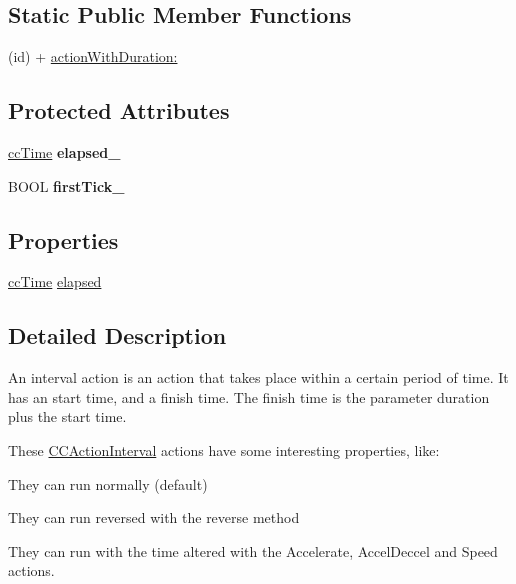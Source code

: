 \subsection*{Static Public Member Functions}
\begin{DoxyCompactItemize}
\item 
(id) + \hyperlink{class_c_c_action_interval_a08fbc347478cca16ab1fe936a1770dc0}{action\-With\-Duration\-:}
\end{DoxyCompactItemize}
\subsection*{Protected Attributes}
\begin{DoxyCompactItemize}
\item 
\hypertarget{class_c_c_action_interval_a98405542977136ef4f4d031556bccf7a}{\hyperlink{cc_types_8h_ae6c674aac4bfb46a4e6cb1e89bb66b4f}{cc\-Time} {\bfseries elapsed\-\_\-}}\label{class_c_c_action_interval_a98405542977136ef4f4d031556bccf7a}

\item 
\hypertarget{class_c_c_action_interval_ad6bf36cabba9c63becb517fc394fe858}{B\-O\-O\-L {\bfseries first\-Tick\-\_\-}}\label{class_c_c_action_interval_ad6bf36cabba9c63becb517fc394fe858}

\end{DoxyCompactItemize}
\subsection*{Properties}
\begin{DoxyCompactItemize}
\item 
\hyperlink{cc_types_8h_ae6c674aac4bfb46a4e6cb1e89bb66b4f}{cc\-Time} \hyperlink{class_c_c_action_interval_a45c12de7cb8ef074d8c0a1915ae65bea}{elapsed}
\end{DoxyCompactItemize}


\subsection{Detailed Description}
An interval action is an action that takes place within a certain period of time. It has an start time, and a finish time. The finish time is the parameter duration plus the start time.

These \hyperlink{class_c_c_action_interval}{C\-C\-Action\-Interval} actions have some interesting properties, like\-:
\begin{DoxyItemize}
\item They can run normally (default)
\item They can run reversed with the reverse method
\item They can run with the time altered with the Accelerate, Accel\-Deccel and Speed actions.
\end{DoxyItemize}

